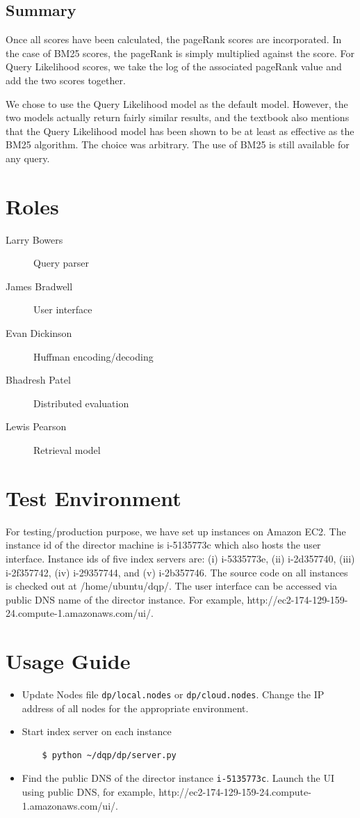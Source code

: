 \documentclass[letterpaper,11pt,twoside]{article}
\begin{document}
\subsection{Summary}
Once all scores have been calculated, the pageRank scores are incorporated. In the case of BM25 scores, the pageRank is simply multiplied against the score. For Query Likelihood scores, we take the log of the associated pageRank value and add the two scores together.

We chose to use the Query Likelihood model as the default model. However, the two models actually return fairly similar results, and the textbook also mentions that the Query Likelihood model has been shown to be at least as effective as the BM25 algorithm. The choice was arbitrary. The use of BM25 is still available for any query.

\section{Roles}
\begin{description}
  \item[Larry Bowers] Query parser
  \item[James Bradwell] User interface
  \item[Evan Dickinson] Huffman encoding/decoding 
  \item[Bhadresh Patel] Distributed evaluation
  \item[Lewis Pearson] Retrieval model
\end{description}

\section{Test Environment}

For testing/production purpose, we have set up instances on Amazon EC2. The instance id of the director machine is i-5135773c which also hosts the user interface. Instance ids of five index servers are: (i) i-5335773e, (ii) i-2d357740, (iii) i-2f357742, (iv) i-29357744, and (v) i-2b357746. The source code on all instances is checked out at /home/ubuntu/dqp/. The user interface can be accessed via public DNS name of the director instance. For example, http://ec2-174-129-159-24.compute-1.amazonaws.com/ui/.

\section{Usage Guide}

\begin{itemize}
	\item Update Nodes file \texttt{dp/local.nodes} or \texttt{dp/cloud.nodes}. Change the IP address of all nodes for the appropriate environment.
	\item Start index server on each instance
\begin{verbatim}
	$ python ~/dqp/dp/server.py
\end{verbatim}
	\item Find the public DNS of the director instance \texttt{i-5135773c}. Launch the UI using public DNS, for example, http://ec2-174-129-159-24.compute-1.amazonaws.com/ui/.
\end{itemize}
\end{document}

